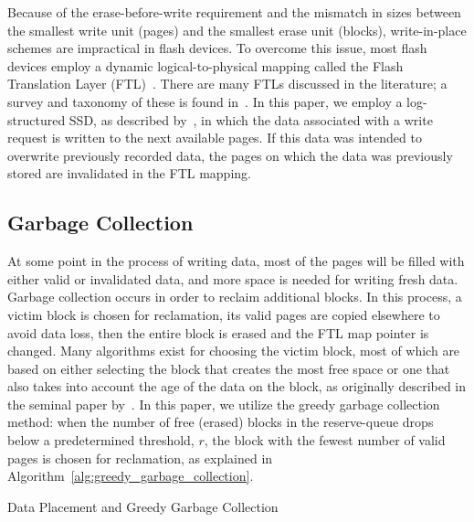 \documentclass[prodmode,acmtos]{acmsmall}
\begin{document}
Because of the erase-before-write requirement and the mismatch in sizes between the smallest write unit (pages) and the smallest erase unit (blocks), write-in-place schemes are impractical in flash devices.  To overcome this issue, most flash devices employ a dynamic logical-to-physical mapping called the Flash Translation Layer (FTL)~\cite{chung2009survey,gupta2009dftl}.  There are many FTLs discussed in the literature; a survey and taxonomy of these is found in~\cite{chung2009survey}.  In this paper, we employ a log-structured SSD, as described by~, in which the data associated with a write request is written to the next available pages.  If this data was intended to overwrite previously recorded data, the pages on which the data was previously stored are invalidated in the FTL mapping.

\subsection{Garbage Collection}
At some point in the process of writing data, most of the pages will be filled with either valid or invalidated data, and more space is needed for writing fresh data. Garbage collection occurs in order to reclaim additional blocks.  In this process, a victim block is chosen for reclamation, its valid pages are copied elsewhere to avoid data loss, then the entire block is erased and the FTL map pointer is changed.  Many algorithms exist for choosing the victim block, most of which are based on either selecting the block that creates the most free space or one that also takes into account the age of the data on the block, as originally described in the seminal paper by~.  In this paper, we utilize the greedy garbage collection method: when the number of free (erased) blocks in the reserve-queue drops below a predetermined threshold, $r$, the block with the fewest number of valid pages is chosen for reclamation, as explained in Algorithm~\ref{alg:greedy_garbage_collection}.


\begin{algorithm}[t]
\SetAlgoNoLine
{}

\caption{Data Placement and Greedy Garbage Collection}
\label{alg:greedy_garbage_collection}
\end{algorithm}
\end{document}
